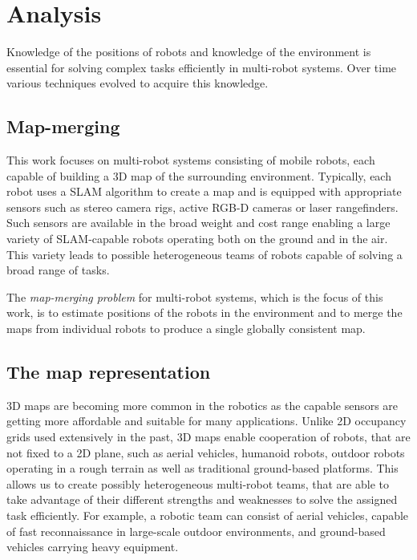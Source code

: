 \chapter{Analysis}
\label{chap:analysis}

Knowledge of the positions of robots and knowledge of the environment is essential for solving complex tasks efficiently in multi-robot systems. Over time various techniques evolved to acquire this knowledge.

\section{Map-merging}

This work focuses on multi-robot systems consisting of mobile robots, each capable of building a \gls{3D} map of the surrounding environment. Typically, each robot uses a \gls{SLAM} algorithm to create a map and is equipped with appropriate sensors such as stereo camera rigs, active \gls{RGB-D} cameras or laser rangefinders. Such sensors are available in the broad weight and cost range enabling a large variety of \gls{SLAM}-capable robots operating both on the ground and in the air. This variety leads to possible heterogeneous teams of robots capable of solving a broad range of tasks.

The \textit{map-merging problem} for multi-robot systems, which is the focus of this work, is to estimate positions of the robots in the environment and to merge the maps from individual robots to produce a single globally consistent map.

\section{The map representation}

\Gls{3D} maps are becoming more common in the robotics as the capable sensors are getting more affordable and suitable for many applications. Unlike \gls{2D} occupancy grids used extensively in the past, \gls{3D} maps enable cooperation of robots, that are not fixed to a \gls{2D} plane, such as aerial vehicles, humanoid robots, outdoor robots operating in a rough terrain as well as traditional ground-based platforms. This allows us to create possibly heterogeneous multi-robot teams, that are able to take advantage of their different strengths and weaknesses to solve the assigned task efficiently. For example, a robotic team can consist of aerial vehicles, capable of fast reconnaissance in large-scale outdoor environments, and ground-based vehicles carrying heavy equipment.

